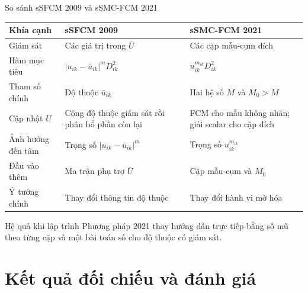\documentclass[t,aspectratio=169]{beamer}
\begin{document}
\begin{frame}{So sánh sSFCM 2009 và sSMC-FCM 2021}
  \centering
  \footnotesize
  \setlength{\tabcolsep}{3pt}
  \renewcommand{\arraystretch}{1.22}
  \begin{tabular}{p{2.15cm}|p{5.55cm}|p{5.55cm}}
    \textbf{Khía cạnh} & \textbf{sSFCM 2009} & \textbf{sSMC-FCM 2021} \\
    \hline
    Giám sát & Các giá trị trong $\bar U$ & Các cặp mẫu-cụm đích \\
    Hàm mục tiêu & $|u_{ik}-\bar u_{ik}|^mD_{ik}^2$ & $u_{ik}^{m_{ik}}D_{ik}^2$ \\
    Tham số chính & Độ thuộc $\bar u_{ik}$ & Hai hệ số $M$ và $M_0>M$ \\
    Cập nhật $U$ & Cộng độ thuộc giám sát rồi phân bổ phần còn lại & FCM cho mẫu không nhãn; giải scalar cho cặp đích \\
    Ảnh hưởng đến tâm & Trọng số $|u_{ik}-\bar u_{ik}|^m$ & Trọng số $u_{ik}^{m_{ik}}$ \\
    Đầu vào thêm & Ma trận phụ trợ $\bar U$ & Cặp mẫu-cụm và $M_0$ \\
    Ý tưởng chính & Thay đổi thông tin độ thuộc & Thay đổi hành vi mờ hóa \\
  \end{tabular}

  \vspace{0.5em}
  \begin{alertblock}{Hệ quả khi lập trình}
    Phương pháp 2021 thay hướng dẫn trực tiếp bằng số mũ theo từng cặp và một bài toán số cho độ thuộc có giám sát.
  \end{alertblock}
\end{frame}

\section{Kết quả đối chiếu và đánh giá}
\end{document}
